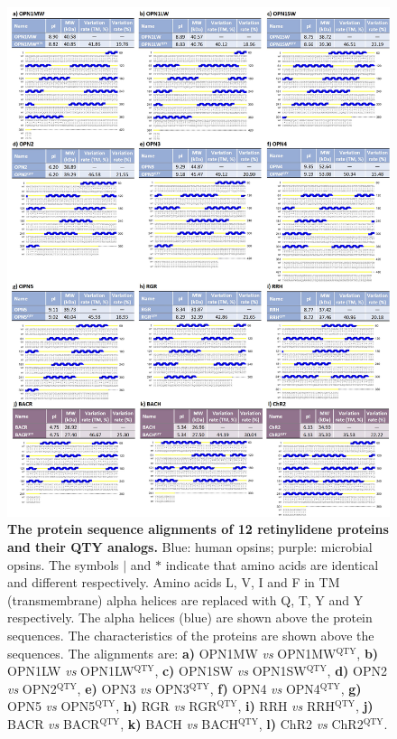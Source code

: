 \documentclass[fleqn, 10pt, lineno]{manuscript}
\begin{document}
\begin{figure}[htbp]
	\centering
	\includegraphics[width=\linewidth]{Figures/sequences.jpg}
        \vspace{-0.5cm}
	\caption{\textbf{The protein sequence alignments of 12 retinylidene proteins and their QTY analogs. } Blue: human opsins; purple: microbial opsins. The symbols $|$ and $*$ indicate that amino acids are identical and different respectively. Amino acids L, V, I and F in TM (transmembrane) alpha helices are replaced with Q, T, Y and Y respectively. The alpha helices (blue) are shown above the protein sequences. The characteristics of the proteins are shown above the sequences. 
    The alignments are: 
    \textbf{a)} OPN1MW \textit{vs} OPN1MW$^{\textrm{QTY}}$, 
    \textbf{b)} OPN1LW \textit{vs} OPN1LW$^{\textrm{QTY}}$, 
    \textbf{c)} OPN1SW \textit{vs} OPN1SW$^{\textrm{QTY}}$, 
    \textbf{d)} OPN2 \textit{vs} OPN2$^{\textrm{QTY}}$, 
    \textbf{e)} OPN3 \textit{vs} OPN3$^{\textrm{QTY}}$, 
    \textbf{f)} OPN4 \textit{vs} OPN4$^{\textrm{QTY}}$, 
    \textbf{g)} OPN5 \textit{vs} OPN5$^{\textrm{QTY}}$, 
    \textbf{h)} RGR \textit{vs} RGR$^{\textrm{QTY}}$, 
    \textbf{i)} RRH \textit{vs} RRH$^{\textrm{QTY}}$, 
    \textbf{j)} BACR \textit{vs} BACR$^{\textrm{QTY}}$, 
    \textbf{k)} BACH \textit{vs} BACH$^{\textrm{QTY}}$, 
    \textbf{l)} ChR2 \textit{vs} ChR2$^{\textrm{QTY}}$. }
	\label{fig:sequences}
\end{figure}
\end{document}
